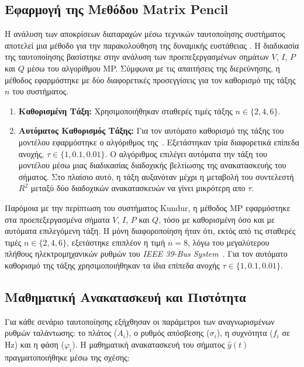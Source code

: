 \subsection{Εφαρμογή της Μεθόδου Matrix Pencil}
\ifkundursystemanalysis
Η ανάλυση των αποκρίσεων διαταραχών μέσω τεχνικών ταυτοποίησης συστήματος αποτελεί μια μέθοδο για την παρακολούθηση της δυναμικής ευστάθειας \cite{modal2018}. Η διαδικασία της ταυτοποίησης βασίστηκε στην ανάλυση των προεπεξεργασμένων σημάτων $V$, $I$, $P$ και $Q$ μέσω του αλγορίθμου MP. Σύμφωνα με τις απαιτήσεις της διερεύνησης, η μέθοδος εφαρμόστηκε με δύο διαφορετικές προσεγγίσεις για τον καθορισμό της τάξης $n$ του συστήματος.

\begin{enumerate}
    \item \textbf{Καθορισμένη Τάξη:} Χρησιμοποιήθηκαν σταθερές τιμές τάξης $n \in \{2, 4, 6\}$.
    \item \textbf{Αυτόματος Καθορισμός Τάξης:} Για τον αυτόματο καθορισμό της τάξης του μοντέλου εφαρμόστηκε ο αλγόριθμος της~\cite{estimation2021}. Εξετάστηκαν τρία διαφορετικά επίπεδα ανοχής, $\tau \in \{1, 0.1, 0.01\}$. Ο αλγόριθμος επιλέγει αυτόματα την τάξη του μοντέλου μέσω μιας διαδικασίας διαδοχικής βελτίωσης της ανακατασκευής του σήματος. Στο πλαίσιο αυτό, η τάξη αυξανόταν μέχρι η μεταβολή του συντελεστή $R^2$ μεταξύ δύο διαδοχικών ανακατασκευών να γίνει μικρότερη απο $\tau$.
\end{enumerate}
\else
Παρόμοια με την περίπτωση του συστήματος Kundur, η μέθοδος MP εφαρμόστηκε στα προεπεξεργασμένα σήματα $V$, $I$, $P$ και $Q$, τόσο με καθορισμένη όσο και με αυτόματα επιλεγόμενη τάξη. Η μόνη διαφοροποίηση ήταν ότι, εκτός από τις σταθερές τιμές $n\in\{2,4,6\}$, εξετάστηκε επιπλέον η τιμή $n=8$, λόγω του μεγαλύτερου πλήθους ηλεκτρομηχανικών ρυθμών του \textenglish{\textit{IEEE 39-Bus System}}~\cite{sarkar2024drga}. Για τον αυτόματο καθορισμό της τάξης χρησιμοποιήθηκαν τα ίδια επίπεδα ανοχής $\tau\in\{1,0.1,0.01\}$.
\fi

\subsection{Μαθηματική Ανακατασκευή και Πιστότητα}
\ifkundursystemanalysis
Για κάθε σενάριο ταυτοποίησης εξήχθησαν οι παράμετροι των αναγνωρισμένων ρυθμών ταλάντωσης: το πλάτος ($A_{i}$), ο ρυθμός απόσβεσης ($\sigma_{i}$), η συχνότητα ($f_{i}$ σε Hz) και η φάση ($\varphi_{i}$). Η μαθηματική ανακατασκευή του σήματος $\hat{y}(t)$ πραγματοποιήθηκε μέσω της σχέσης:

